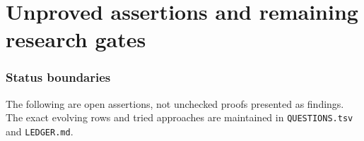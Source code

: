 \documentclass[11pt,a4paper]{article}
\begin{document}


































\part{Unproved assertions and remaining research gates}
\section{Status boundaries}
The following are open assertions, not unchecked proofs presented
as findings. The exact evolving rows and tried approaches are
maintained in \texttt{QUESTIONS.tsv} and \texttt{LEDGER.md}.
\end{document}
